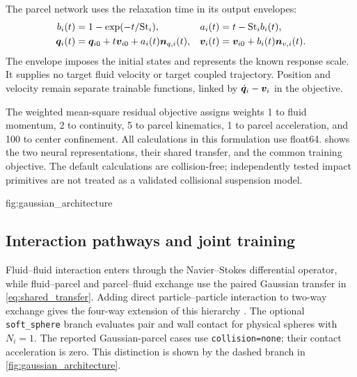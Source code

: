 The parcel network uses the relaxation time in its output envelopes:
\begin{align}
 b_i(t)&=1-\exp(-t/\mathrm{St}_i),&
 a_i(t)&=t-\mathrm{St}_i b_i(t),\\
 \bm{q}_i(t)&=\bm{q}_{i0}+t\bm{v}_{i0}
                    +a_i(t)\bm{n}_{q,i}(t),&
 \bm{v}_i(t)&=\bm{v}_{i0}+b_i(t)\bm{n}_{v,i}(t).
 \label{eq:parcel_ansatz}
\end{align}
The envelope imposes the initial states and represents the known response
scale. It supplies no target fluid velocity or target coupled trajectory.
Position and velocity remain separate trainable functions, linked by
$\dot{\bm{q}}_i-\bm{v}_i$ in the objective.

The weighted mean-square residual objective assigns weights 1 to fluid
momentum, 2 to continuity, 5 to parcel kinematics, 1 to parcel acceleration,
and 100 to center confinement. All calculations in this formulation use
float64.  shows the two neural representations,
their shared transfer, and the common training objective.
The default calculations are
collision-free; independently tested impact primitives are not treated as
a validated collisional suspension model.

{fig:gaussian_architecture}

\subsection{Interaction pathways and joint training}
Fluid--fluid interaction enters through the Navier--Stokes differential
operator, while fluid--parcel and parcel--fluid exchange use the paired
Gaussian transfer in \cref{eq:shared_transfer}. Adding direct
particle--particle interaction to two-way exchange gives the four-way
extension of this hierarchy \citep{elghobashi1994,balachandar2010}.
The optional \texttt{soft\_sphere} branch evaluates pair and wall contact
for physical spheres with $N_i=1$. The reported Gaussian-parcel cases
use \texttt{collision=none}; their contact acceleration is zero.
This distinction is shown by the dashed branch in
\cref{fig:gaussian_architecture}.

